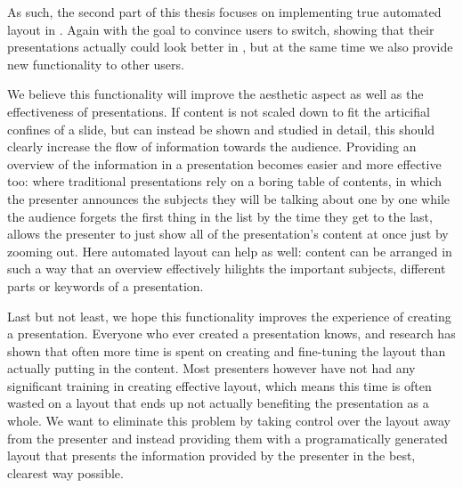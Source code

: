   As such, the second part of this thesis focuses on implementing true
  automated layout in \mxp. Again with the goal to convince \ppt* users to
  switch, showing that their presentations actually could look better in \mxp,
  but at the same time we also provide new functionality to other \mxp users.

  We believe this functionality will improve the aesthetic aspect as well as
  the effectiveness of presentations. If content is not scaled down to fit the
  articifial confines of a slide, but can instead be shown and studied in
  detail, this should clearly increase the flow of information towards the
  audience. Providing an overview of the information in a presentation becomes
  easier and more effective too: where traditional presentations rely on a
  boring table of contents, in which the presenter announces the subjects
  they will be talking about one by one while the audience forgets the first
  thing in the list by the time they get to the last, \mxp allows the presenter
  to just show all of the presentation's content at once just by zooming out.
  Here automated layout can help as well: content can be arranged in such a way
  that an overview effectively hilights the important subjects, different parts
  or keywords of a presentation.

  Last but not least, we hope this functionality improves the experience of
  creating a presentation. Everyone who ever created a presentation knows, and
  research has shown \citep{lok-1} that often more time is spent on creating
  and fine-tuning the layout than actually putting in the content. Most
  presenters however have not had any significant training in creating
  effective layout, which means this time is often wasted on a layout that ends
  up not actually benefiting the presentation as a whole. We want to eliminate
  this problem by taking control over the layout away from the presenter and
  instead providing them with a programatically generated layout that presents
  the information provided by the presenter in the best, clearest way possible.
